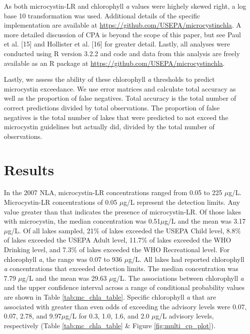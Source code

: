 \documentclass[11pt,]{article}
\begin{document}
As both microcystin-LR and chlorophyll \emph{a} values were highely
skewed right, a log base 10 transformation was used. Additional details
of the specific implementation are available at
\url{https://github.com/USEPA/microcystinchla}. A more detailed
discussion of CPA is beyond the scope of this paper, but see Paul et al.
{[}15{]} and Hollister et al. {[}16{]} for greater detail. Lastly, all
analyses were conducted using R version 3.2.2 and code and data from
this analysis are freely available as an R package at
\href{https://github.com/USAPE/microcystinchla}{\url{https://github.com/USEPA/microcystinchla}}.

Lastly, we assess the ability of these chlorophyll \emph{a} thresholds
to predict microcystin exceedance. We use error matrices and calculate
total accuracy as well as the proportion of false negatives. Total
accuracy is the total number of correct predictions divided by total
observations. The proportion of false negatives is the total number of
lakes that were predicted to not exceed the microcystin guidelines but
actually did, divided by the total number of observations.

\section{Results}\label{results}

In the 2007 NLA, microcystin-LR concentrations ranged from 0.05 to 225
\(\mu\)g/L. Microcystin-LR concentrations of 0.05 \(\mu\)g/L represent
the detection limits. Any value greater than that indicates the presence
of microcystin-LR. Of those lakes with microcystin, the median
concentration was 0.51\(\mu\)g/L and the mean was 3.17\(\mu\)g/L. Of all
lakes sampled, 21\% of lakes exceeded the USEPA Child level, 8.8\% of
lakes exceeded the USEPA Adult level, 11.7\% of lakes exceeded the WHO
Drinking level, and 7.3\% of lakes exceeded the WHO Recreational level.
For chlorophyll \emph{a}, the range was 0.07 to 936 \(\mu\)g/L. All
lakes had reported chlorophyll \emph{a} concentrations that exceeded
detection limits. The median concentration was 7.79 \(\mu\)g/L and the
mean was 29.63 \(\mu\)g/L. The associations between chlorophyll \emph{a}
and the upper confidence interval across a range of conditional
probability values are shown in Table \ref{tab:mc_chla_table}. Specific
chlorophyll \emph{a} that are associated with greater than even odds of
exceeding the advisory levels were 0.07, 0.07, 2.78, and 9.97\(\mu\)g/L
for 0.3, 1.0, 1.6, and 2.0 \(\mu\)g/L advisory levels, respectively
(Table \ref{tab:mc_chla_table} \& Figure \ref{fig:multi_cp_plot}).
\end{document}
